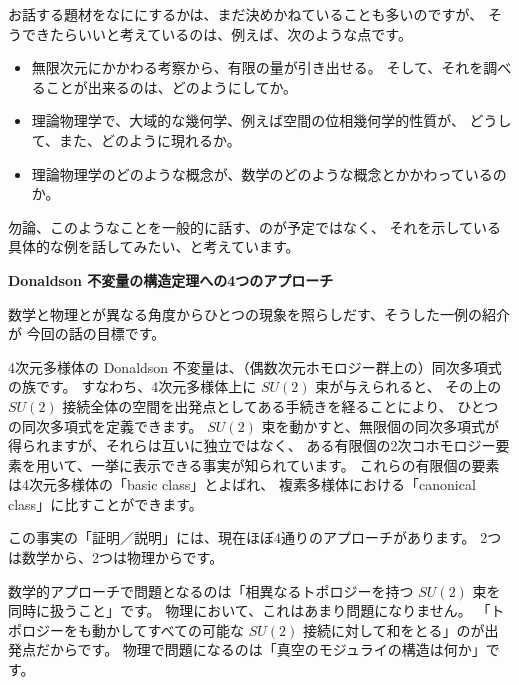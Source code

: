 \documentclass[uplatex,dvipdfmx]{jlreq}
\begin{document}
お話する題材をなににするかは、まだ決めかねていることも多いのですが、
そうできたらいいと考えているのは、例えば、次のような点です。
\begin{itemize}
  \item 無限次元にかかわる考察から、有限の量が引き出せる。
        そして、それを調べることが出来るのは、どのようにしてか。
  \item 理論物理学で、大域的な幾何学、例えば空間の位相幾何学的性質が、
        どうして、また、どのように現れるか。
  \item 理論物理学のどのような概念が、数学のどのような概念とかかわっているのか。
\end{itemize}

勿論、このようなことを一般的に話す、のが予定ではなく、
それを示している具体的な例を話してみたい、と考えています。

\newpage

\noindent
{\large\bfseries Donaldson 不変量の構造定理への4つのアプローチ}

\bigskip
\hspace*{\fill}{\large\bfseries 古田　幹雄（京大・数理研）}

\bigskip

数学と物理とが異なる角度からひとつの現象を照らしだす、そうした一例の紹介が
今回の話の目標です。

4次元多様体の Donaldson 不変量は、（偶数次元ホモロジー群上の）同次多項式の族です。
すなわち、4次元多様体上に $SU(2)$ 束が与えられると、
その上の $SU(2)$ 接続全体の空間を出発点としてある手続きを経ることにより、
ひとつの同次多項式を定義できます。
$SU(2)$ 束を動かすと、無限個の同次多項式が得られますが、それらは互いに独立ではなく、
ある有限個の2次コホモロジー要素を用いて、一挙に表示できる事実が知られています。
これらの有限個の要素は4次元多様体の「basic class」とよばれ、
複素多様体における「canonical class」に比すことができます。

この事実の「証明／説明」には、現在ほぼ4通りのアプローチがあります。
2つは数学から、2つは物理からです。

数学的アプローチで問題となるのは「相異なるトポロジーを持つ $SU(2)$ 束を同時に扱うこと」です。
物理において、これはあまり問題になりません。
「トポロジーをも動かしてすべての可能な $SU(2)$ 接続に対して和をとる」のが出発点だからです。
物理で問題になるのは「真空のモジュライの構造は何か」です。
\end{document}
